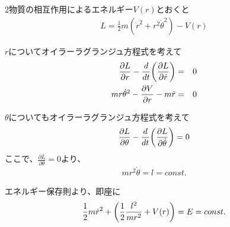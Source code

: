 \documentclass[dvipdfmx]{report} %
\begin{document}
2物質の相互作用によるエネルギー$V(r)$とおくと\\
\begin{eqnarray*}
	L = \frac{1}{2} m ( \dot{r}^2 + r^2 \dot{ \theta }^2 ) - V(r)
\end{eqnarray*}
\begin{tcolorbox}
$r$についてオイラーラグランジュ方程式を考えて\\
\begin{eqnarray}
	\frac{ \partial L }{ \partial r } - \frac{d}{dt} \biggl{(} \frac{\partial L}{\partial \dot{r}}  \biggr{)} &=& 0 \nonumber \\
	mr \dot{\theta}^2 - \frac{ \partial V }{ \partial r } - m \ddot{r} &=& 0
\end{eqnarray}
\end{tcolorbox}
\begin{tcolorbox}
$\theta$についてもオイラーラグランジュ方程式を考えて\\
$$
\frac{ \partial L }{ \partial \theta } - \frac{d}{dt} \biggl{(} \frac{\partial L}{\partial \dot{\theta}}  \biggr{)} = 0
$$
ここで、$\frac{ \partial L }{ \partial \theta } = 0$より、
\begin{eqnarray}
	mr^2\dot{ \theta } = l = const.
\end{eqnarray}
\end{tcolorbox}
\begin{tcolorbox}
エネルギー保存則より、即座に
\begin{eqnarray}
	\frac{1}{2} m \dot{r}^2 + \biggl{(} \frac{1}{2} \frac{l^2}{mr^2} + V(r) \biggr{)} = E = const.
\end{eqnarray}
\end{tcolorbox}
\end{document}
